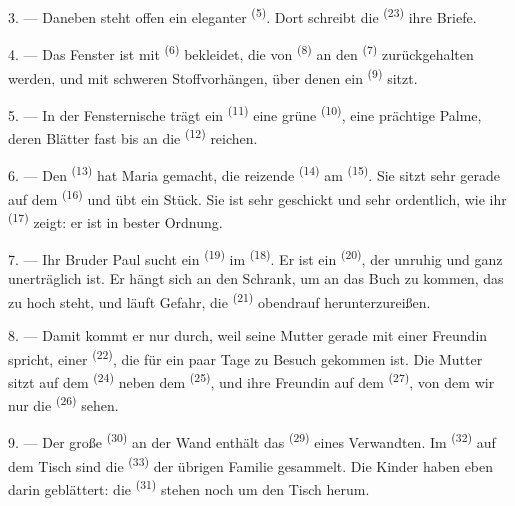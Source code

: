 3. --- Daneben steht offen ein eleganter 
\textsuperscript{(5)}. Dort schreibt die  \textsuperscript{(23)}
ihre Briefe.

4. --- Das Fenster ist mit  \textsuperscript{(6)} bekleidet, die von
 \textsuperscript{(8)} an den 
\textsuperscript{(7)} zurückgehalten werden, und mit schweren Stoffvorhängen, über
denen ein  \textsuperscript{(9)} sitzt.

5. --- In der Fensternische trägt ein  \textsuperscript{(11)}
eine grüne  \textsuperscript{(10)}, eine prächtige Palme, deren
Blätter fast bis an die  \textsuperscript{(12)} reichen.

6. --- Den  \textsuperscript{(13)} hat Maria gemacht, die
reizende  \textsuperscript{(14)} am 
\textsuperscript{(15)}. Sie sitzt sehr gerade auf dem 
\textsuperscript{(16)} und übt ein Stück. Sie ist sehr geschickt und sehr ordentlich,
wie ihr  \textsuperscript{(17)} zeigt: er ist in bester Ordnung.

\VUsaut{5.0mm}
\VUsaut{3.0mm}

7. --- Ihr Bruder Paul sucht ein  \textsuperscript{(19)} im
 \textsuperscript{(18)}. Er ist ein 
\textsuperscript{(20)}, der unruhig und ganz unerträglich ist. Er hängt sich an den
Schrank, um an das Buch zu kommen, das zu hoch steht, und läuft Gefahr, die
 \textsuperscript{(21)} obendrauf herunterzureißen.

8. --- Damit kommt er nur durch, weil seine Mutter gerade mit einer Freundin
spricht, einer  \textsuperscript{(22)}, die für ein paar Tage zu Besuch
gekommen ist. Die Mutter sitzt auf dem  \textsuperscript{(24)} neben dem
 \textsuperscript{(25)}, und ihre Freundin auf dem 
\textsuperscript{(27)}, von dem wir nur die  \textsuperscript{(26)}
sehen.

9. --- Der große  \textsuperscript{(30)} an der Wand enthält das
 \textsuperscript{(29)} eines Verwandten. Im 
\textsuperscript{(32)} auf dem Tisch sind die 
\textsuperscript{(33)} der übrigen Familie gesammelt. Die Kinder haben eben darin
geblättert: die  \textsuperscript{(31)} stehen noch um den Tisch
herum.

